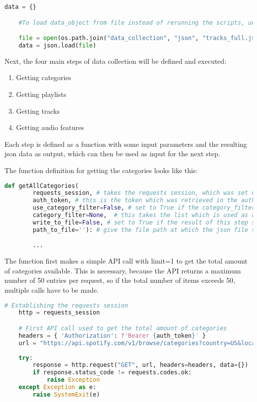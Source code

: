 \begin{lstlisting}[language=Python]
    data = {}

    #To load data_object from file instead of rerunning the scripts, uncomment this:

    file = open(os.path.join("data_collection", "json", "tracks_full.json"))
    data = json.load(file)
\end{lstlisting} 

Next, the four main steps of data collection will be defined and executed:

\begin{enumerate}
    \item Getting categories
    \item Getting playlists
    \item Getting tracks
    \item Getting audio features
\end{enumerate}

Each step is defined as a function with some input parameters and the resulting json data as output, which can then
be used as input for the next step.

The function definition for getting the categories looks like this:

\begin{lstlisting}[language=Python]
    def getAllCategories(
        requests_session, # takes the requests session, which was set up in the beginning
        auth_token, # this is the token which was retrieved in the authorization step
        use_category_filter=False, # set to True if the category_filter should be used
        category_filter=None,  # this takes the list which is used as a category filter
        write_to_file=False, # set to True if the result of this step should be written into a json file
        path_to_file=''): # give the file path at which the json file should be stored

        ...
\end{lstlisting}

The function first makes a simple API call with limit=1 to get the total amount of categories available.
This is necessary, because the API returns a maximum number of 50 entries per request, so if the total number of
items exceeds 50, multiple calls have to be made.

\begin{lstlisting}[language=Python]
    # Establishing the requests session
    http = requests_session

    # First API call used to get the total amount of categories
    headers = { 'Authorization': f'Bearer {auth_token}' }
    url = "https://api.spotify.com/v1/browse/categories?country=US&locale=en_US&limit=1"
    
    try:
        response = http.request("GET", url, headers=headers, data={})
        if response.status_code != requests.codes.ok:
            raise Exception
    except Exception as e:
        raise SystemExit(e)
\end{lstlisting}

